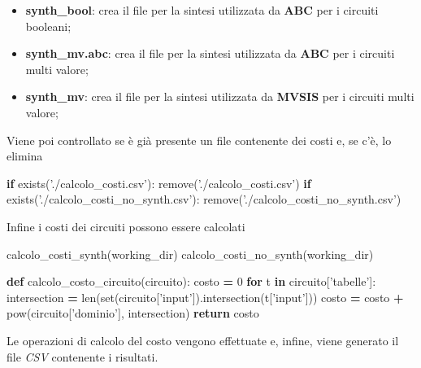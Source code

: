 \documentclass[italian,]{book}
\newenvironment{Shaded}{\begin{snugshade}}{\end{snugshade}}
\newcommand{\BuiltInTok}[1]{#1}
\newcommand{\ControlFlowTok}[1]{\textcolor[rgb]{0.13,0.29,0.53}{\textbf{#1}}}
\newcommand{\DecValTok}[1]{\textcolor[rgb]{0.00,0.00,0.81}{#1}}
\newcommand{\KeywordTok}[1]{\textcolor[rgb]{0.13,0.29,0.53}{\textbf{#1}}}
\newcommand{\NormalTok}[1]{#1}
\newcommand{\OperatorTok}[1]{\textcolor[rgb]{0.81,0.36,0.00}{\textbf{#1}}}
\newcommand{\StringTok}[1]{\textcolor[rgb]{0.31,0.60,0.02}{#1}}
\providecommand{\tightlist}{%
  \setlength{\itemsep}{0pt}\setlength{\parskip}{0pt}}
\begin{document}
\begin{itemize}
\tightlist
\item
  \textbf{synth\_bool}: crea il file per la sintesi utilizzata da \textbf{ABC} per i circuiti booleani;
\item
  \textbf{synth\_mv.abc}: crea il file per la sintesi utilizzata da \textbf{ABC} per i circuiti multi valore;
\item
  \textbf{synth\_mv}: crea il file per la sintesi utilizzata da \textbf{MVSIS} per i circuiti multi valore;
\end{itemize}

\newpage

Viene poi controllato se è già presente un file contenente dei costi e, se c'è, lo elimina

\begin{Shaded}
\begin{Highlighting}[]
\ControlFlowTok{if}\NormalTok{ exists(}\StringTok{'./calcolo_costi.csv'}\NormalTok{):}
\NormalTok{    remove(}\StringTok{'./calcolo_costi.csv'}\NormalTok{)}
\ControlFlowTok{if}\NormalTok{ exists(}\StringTok{'./calcolo_costi_no_synth.csv'}\NormalTok{):}
\NormalTok{    remove(}\StringTok{'./calcolo_costi_no_synth.csv'}\NormalTok{)}
\end{Highlighting}
\end{Shaded}

Infine i costi dei circuiti possono essere calcolati

\begin{Shaded}
\begin{Highlighting}[]
\NormalTok{calcolo_costi_synth(working_dir)}
\NormalTok{calcolo_costi_no_synth(working_dir)}

\KeywordTok{def}\NormalTok{ calcolo_costo_circuito(circuito):}
\NormalTok{  costo }\OperatorTok{=} \DecValTok{0}
  \ControlFlowTok{for}\NormalTok{ t }\KeywordTok{in}\NormalTok{ circuito[}\StringTok{'tabelle'}\NormalTok{]:}
\NormalTok{    intersection }\OperatorTok{=} \BuiltInTok{len}\NormalTok{(}\BuiltInTok{set}\NormalTok{(circuito[}\StringTok{'input'}\NormalTok{]).intersection(t[}\StringTok{'input'}\NormalTok{]))}
\NormalTok{    costo }\OperatorTok{=}\NormalTok{ costo }\OperatorTok{+} \BuiltInTok{pow}\NormalTok{(circuito[}\StringTok{'dominio'}\NormalTok{], intersection)}
  \ControlFlowTok{return}\NormalTok{ costo}
\end{Highlighting}
\end{Shaded}

Le operazioni di calcolo del costo vengono effettuate e, infine, viene generato il file \emph{CSV} contenente i risultati.
\end{document}

